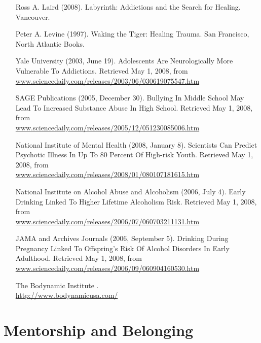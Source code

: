 \documentclass[12pt,DIV9,oneside,headsepline,footsepline]{scrreprt}
\begin{document}
\begin{itemize}

\item [Ross A. Laird] (2008). Labyrinth: Addictions and the Search for
Healing. Vancouver.

\item [Peter A. Levine] (1997). Waking the Tiger: Healing Trauma. San
Francisco, North Atlantic Books.

\item [Yale University] (2003, June 19). Adolescents Are
Neurologically More Vulnerable To Addictions. Retrieved May 1, 2008,
from \\
\url{www.sciencedaily.com/releases/2003/06/030619075547.htm}

\item [SAGE Publications] (2005, December 30). Bullying In Middle
School May Lead To Increased Substance Abuse In High School. Retrieved
May 1, 2008, from \\
\url{www.sciencedaily.com/releases/2005/12/051230085006.htm}

\item [National Institute of Mental Health] (2008, January 8).
Scientists Can Predict Psychotic Illness In Up To 80 Percent Of
High-risk Youth. Retrieved May 1, 2008, from \\
\url{www.sciencedaily.com/releases/2008/01/080107181615.htm}

\item [National Institute on Alcohol Abuse and Alcoholism] (2006, July
4). Early Drinking Linked To Higher Lifetime Alcoholism Risk.
Retrieved May 1, 2008, from \\
\url{www.sciencedaily.com/releases/2006/07/060703211131.htm}

\item [JAMA and Archives Journals] (2006, September 5). Drinking
During Pregnancy Linked To Offspring's Risk Of Alcohol Disorders In
Early Adulthood. Retrieved May 1, 2008, from \\
\url{www.sciencedaily.com/releases/2006/09/060904160530.htm}

\item [The Bodynamic Institute]. \\
\url{http://www.bodynamicusa.com/}

\end{itemize}

\section{Mentorship and Belonging}
\end{document}
